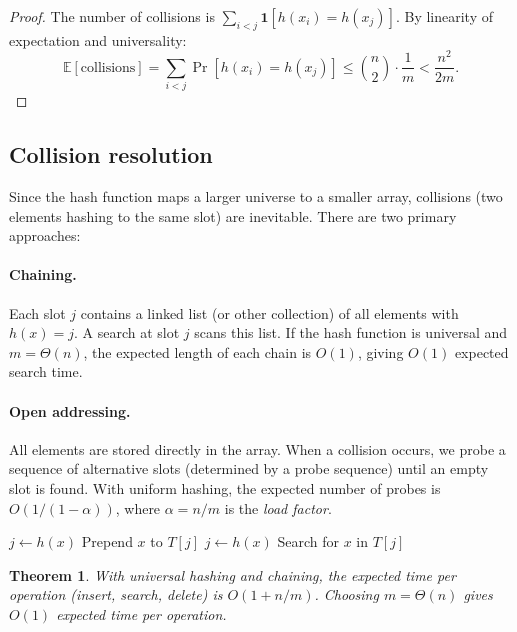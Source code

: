 \documentclass[twoside,12pt]{book}
\theoremstyle{plain}
\newtheorem{theorem}{Theorem}[chapter]
\theoremstyle{definition}
\theoremstyle{remark}
\begin{document}
\begin{proof}
The number of collisions is $\sum_{i < j} \mathbf{1}[h(x_i) = h(x_j)]$. By linearity of expectation and universality:
\[
\mathbb{E}[\text{collisions}] = \sum_{i < j} \Pr[h(x_i) = h(x_j)] \leq \binom{n}{2} \cdot \frac{1}{m} < \frac{n^2}{2m}.
\]
\end{proof}

\subsection{Collision resolution}

Since the hash function maps a larger universe to a smaller array, collisions (two elements hashing to the same slot) are inevitable. There are two primary approaches:

\paragraph{Chaining.} Each slot $j$ contains a linked list (or other collection) of all elements with $h(x) = j$. A search at slot $j$ scans this list. If the hash function is universal and $m = \Theta(n)$, the expected length of each chain is $O(1)$, giving $O(1)$ expected search time.

\paragraph{Open addressing.} All elements are stored directly in the array. When a collision occurs, we probe a sequence of alternative slots (determined by a probe sequence) until an empty slot is found. With uniform hashing, the expected number of probes is $O(1/(1-\alpha))$, where $\alpha = n/m$ is the \emph{load factor}.

\begin{algorithm}[H]
\caption{Hash Table with Chaining}
\begin{algorithmic}[1]
    \State $j \gets h(x)$
    \State Prepend $x$ to $T[j]$
\EndFunction
\State
{}
    \State $j \gets h(x)$
    \State Search for $x$ in $T[j]$
    \State {}
\EndFunction
\end{algorithmic}
\end{algorithm}

\begin{theorem}\label{thm:hash-table}
With universal hashing and chaining, the expected time per operation (insert, search, delete) is $O(1 + n/m)$. Choosing $m = \Theta(n)$ gives $O(1)$ expected time per operation.
\end{theorem}
\end{document}

